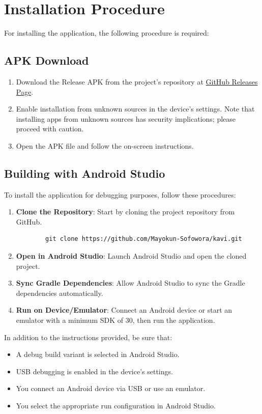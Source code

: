 \section{Installation Procedure}
For installing the application, the following procedure is required:

\subsection{APK Download}
\begin{enumerate}
    \item Download the Release APK from the project's repository at \href{https://github.com/Mayokun-Sofowora/kavi/releases/download/v1.0.0/app-release.apk}{GitHub Releases Page}.
    \item Enable installation from unknown sources in the device's settings. Note that installing apps from unknown sources has security implications; please proceed with caution.
    \item Open the APK file and follow the on-screen instructions.
\end{enumerate}

\subsection{Building with Android Studio}
To install the application for debugging purposes, follow these procedures:
\begin{enumerate}
    \item \textbf{Clone the Repository}: Start by cloning the project repository from GitHub.
    \begin{verbatim}
        git clone https://github.com/Mayokun-Sofowora/kavi.git
    \end{verbatim}
    \item \textbf{Open in Android Studio}: Launch Android Studio and open the cloned project.
    \item \textbf{Sync Gradle Dependencies}: Allow Android Studio to sync the Gradle dependencies automatically.
    \item \textbf{Run on Device/Emulator}: Connect an Android device or start an emulator with a minimum SDK of 30, then run the application.
\end{enumerate}

In addition to the instructions provided, be sure that:
\begin{itemize}
    \item  A debug build variant is selected in Android Studio.
    \item USB debugging is enabled in the device's settings.
    \item You connect an Android device via USB or use an emulator.
    \item  You select the appropriate run configuration in Android Studio.
\end{itemize}

